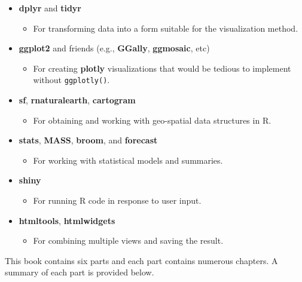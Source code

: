 \documentclass[
  12pt,
]{krantz}
\providecommand{\tightlist}{%
  \setlength{\itemsep}{0pt}\setlength{\parskip}{0pt}}
\begin{document}
\begin{itemize}
\tightlist
\item
  \textbf{dplyr} and \textbf{tidyr}

  \begin{itemize}
  \tightlist
  \item
    For transforming data into a form suitable for the visualization method.
  \end{itemize}
\item
  \textbf{ggplot2} and friends (e.g., \textbf{GGally}, \textbf{ggmosaic}, etc)

  \begin{itemize}
  \tightlist
  \item
    For creating \textbf{plotly} visualizations that would be tedious to implement without \texttt{ggplotly()}.
  \end{itemize}
\item
  \textbf{sf}, \textbf{rnaturalearth}, \textbf{cartogram}

  \begin{itemize}
  \tightlist
  \item
    For obtaining and working with geo-spatial data structures in R.
  \end{itemize}
\item
  \textbf{stats}, \textbf{MASS}, \textbf{broom}, and \textbf{forecast}

  \begin{itemize}
  \tightlist
  \item
    For working with statistical models and summaries.
  \end{itemize}
\item
  \textbf{shiny}

  \begin{itemize}
  \tightlist
  \item
    For running R code in response to user input.
  \end{itemize}
\item
  \textbf{htmltools}, \textbf{htmlwidgets}

  \begin{itemize}
  \tightlist
  \item
    For combining multiple views and saving the result.
  \end{itemize}
\end{itemize}

This book contains six parts and each part contains numerous chapters. A summary of each part is provided below.
\end{document}
